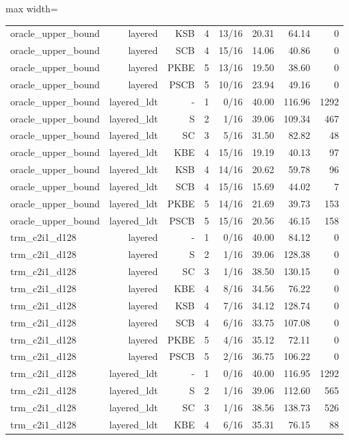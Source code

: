 \begin{table}[t]
\begin{adjustbox}{max width=\linewidth}
\begin{tabular}{lrrrrrrr}
oracle\_upper\_bound & layered & KSB & 4 & 13/16 & 20.31 & 64.14 & 0 \\
oracle\_upper\_bound & layered & SCB & 4 & 15/16 & 14.06 & 40.86 & 0 \\
oracle\_upper\_bound & layered & PKBE & 5 & 13/16 & 19.50 & 38.60 & 0 \\
oracle\_upper\_bound & layered & PSCB & 5 & 10/16 & 23.94 & 49.16 & 0 \\
oracle\_upper\_bound & layered\_ldt & - & 1 & 0/16 & 40.00 & 116.96 & 1292 \\
oracle\_upper\_bound & layered\_ldt & S & 2 & 1/16 & 39.06 & 109.34 & 467 \\
oracle\_upper\_bound & layered\_ldt & SC & 3 & 5/16 & 31.50 & 82.82 & 48 \\
oracle\_upper\_bound & layered\_ldt & KBE & 4 & 15/16 & 19.19 & 40.13 & 97 \\
oracle\_upper\_bound & layered\_ldt & KSB & 4 & 14/16 & 20.62 & 59.78 & 96 \\
oracle\_upper\_bound & layered\_ldt & SCB & 4 & 15/16 & 15.69 & 44.02 & 7 \\
oracle\_upper\_bound & layered\_ldt & PKBE & 5 & 14/16 & 21.69 & 39.73 & 153 \\
oracle\_upper\_bound & layered\_ldt & PSCB & 5 & 15/16 & 20.56 & 46.15 & 158 \\
trm\_c2i1\_d128 & layered & - & 1 & 0/16 & 40.00 & 84.12 & 0 \\
trm\_c2i1\_d128 & layered & S & 2 & 1/16 & 39.06 & 128.38 & 0 \\
trm\_c2i1\_d128 & layered & SC & 3 & 1/16 & 38.50 & 130.15 & 0 \\
trm\_c2i1\_d128 & layered & KBE & 4 & 8/16 & 34.56 & 76.22 & 0 \\
trm\_c2i1\_d128 & layered & KSB & 4 & 7/16 & 34.12 & 128.74 & 0 \\
trm\_c2i1\_d128 & layered & SCB & 4 & 6/16 & 33.75 & 107.08 & 0 \\
trm\_c2i1\_d128 & layered & PKBE & 5 & 4/16 & 35.12 & 72.11 & 0 \\
trm\_c2i1\_d128 & layered & PSCB & 5 & 2/16 & 36.75 & 106.22 & 0 \\
trm\_c2i1\_d128 & layered\_ldt & - & 1 & 0/16 & 40.00 & 116.95 & 1292 \\
trm\_c2i1\_d128 & layered\_ldt & S & 2 & 1/16 & 39.06 & 112.60 & 565 \\
trm\_c2i1\_d128 & layered\_ldt & SC & 3 & 1/16 & 38.56 & 138.73 & 526 \\
trm\_c2i1\_d128 & layered\_ldt & KBE & 4 & 6/16 & 35.31 & 76.15 & 88 \\

\end{tabular}
\end{adjustbox}
\end{table}
